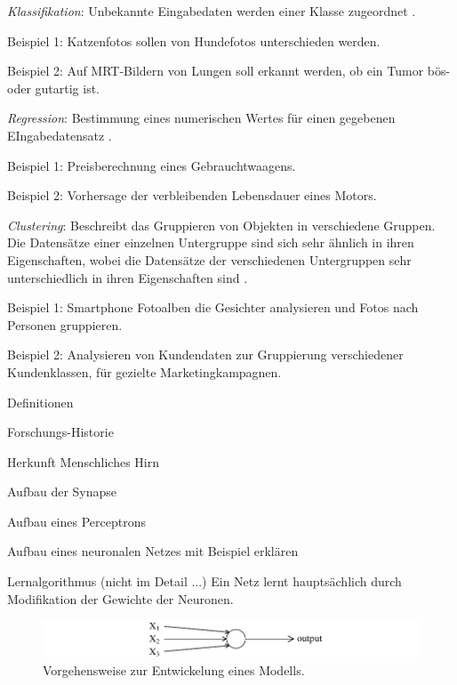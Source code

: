 \begin{itemize*}

\item \emph{Klassifikation}: Unbekannte Eingabedaten werden einer Klasse zugeordnet \cite [vgl. S. 68]{EM17}. 
\begin{itemize*}
\item Beispiel 1: Katzenfotos sollen von Hundefotos unterschieden werden.
\item Beispiel 2: Auf MRT-Bildern von Lungen soll erkannt werden, ob ein Tumor bös- oder gutartig ist.
\end{itemize*}
\item \emph{Regression}: Bestimmung eines numerischen Wertes für einen gegebenen EIngabedatensatz \cite {SG17}.   
\begin{itemize*}
\item Beispiel 1: Preisberechnung eines Gebrauchtwaagens.  
\item Beispiel 2: Vorhersage der verbleibenden Lebensdauer eines Motors.
\end{itemize*}
\item \emph{Clustering}: Beschreibt das Gruppieren von Objekten in verschiedene Gruppen. Die Datensätze einer einzelnen Untergruppe sind sich sehr ähnlich in ihren Eigenschaften, wobei die Datensätze der verschiedenen Untergruppen sehr unterschiedlich in ihren Eigenschaften sind \cite {SG17}.   
\begin{itemize*}
\item Beispiel 1: Smartphone Fotoalben die Gesichter analysieren und Fotos nach Personen gruppieren.  
\item Beispiel 2: Analysieren von Kundendaten zur Gruppierung verschiedener Kundenklassen, für gezielte Marketingkampagnen. 
\end{itemize*}

\end{itemize*}   

Definitionen 

Forschungs-Historie

Herkunft Menschliches Hirn  

Aufbau der Synapse

Aufbau eines Perceptrons 

Aufbau eines neuronalen Netzes mit Beispiel erklären 

Lernalgorithmus (nicht im Detail ...)
Ein Netz lernt hauptsächlich durch Modifikation der Gewichte der Neuronen.


\begin{figure}[ht]
\centering
\includegraphics{images/perceptron.pdf}
\caption{Vorgehensweise zur Entwickelung eines Modells.}
\label{fig:perceptron}
\end{figure}


